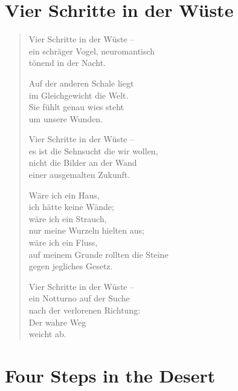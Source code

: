 
\cleartoverso

\section{Vier Schritte in der Wüste}


\begin{verse}

Vier Schritte in der Wüste --\\
ein schräger Vogel, neuromantisch\\
tönend in der Nacht.

Auf der anderen Schale liegt\\
im Gleichgewicht die Welt.\\
Sie fühlt genau wies steht\\
um unsere Wunden.

Vier Schritte in der Wüste --\\
es ist die Sehnsucht die wir wollen,\\
nicht die Bilder an der Wand\\
einer ausgemalten Zukunft.

Wäre ich ein Haus,\\
ich hätte keine Wände;\\
wäre ich ein Strauch,\\
nur meine Wurzeln hielten aus;\\
wäre ich ein Fluss,\\
auf meinem Grunde rollten die Steine\\
gegen jegliches Gesetz.

\clearpage

Vier Schritte in der Wüste --\\
ein Notturno auf der Suche\\
nach der verlorenen Richtung:\\
Der wahre Weg\\
weicht ab.
\end{verse}

\clearpage

\section{Four Steps in the Desert}


